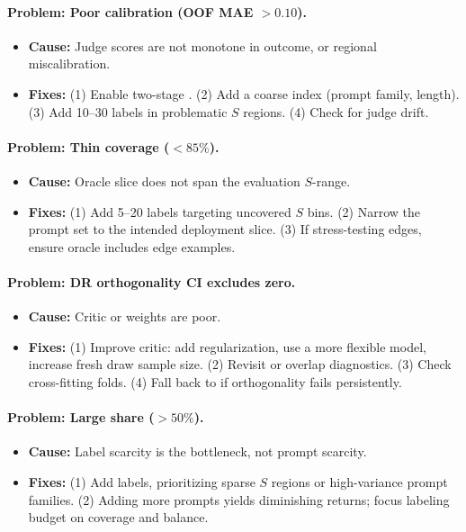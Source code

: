 \paragraph{Problem: Poor calibration (OOF MAE $> 0.10$).}
\begin{itemize}
\item \textbf{Cause:} Judge scores are not monotone in outcome, or regional miscalibration.
\item \textbf{Fixes:} (1) Enable two-stage \autocal. (2) Add a coarse index (prompt family, length). (3) Add 10--30 labels in problematic $S$ regions. (4) Check for judge drift.
\end{itemize}

\paragraph{Problem: Thin coverage ($< 85\%$).}
\begin{itemize}
\item \textbf{Cause:} Oracle slice does not span the evaluation $S$-range.
\item \textbf{Fixes:} (1) Add 5--20 labels targeting uncovered $S$ bins. (2) Narrow the prompt set to the intended deployment slice. (3) If stress-testing edges, ensure oracle includes edge examples.
\end{itemize}

\paragraph{Problem: DR orthogonality CI excludes zero.}
\begin{itemize}
\item \textbf{Cause:} Critic or weights are poor.
\item \textbf{Fixes:} (1) Improve critic: add regularization, use a more flexible model, increase fresh draw sample size. (2) Revisit \simcal{} or overlap diagnostics. (3) Check cross-fitting folds. (4) Fall back to \ips{} if orthogonality fails persistently.
\end{itemize}

\paragraph{Problem: Large \oua{} share ($> 50\%$).}
\begin{itemize}
\item \textbf{Cause:} Label scarcity is the bottleneck, not prompt scarcity.
\item \textbf{Fixes:} (1) Add labels, prioritizing sparse $S$ regions or high-variance prompt families. (2) Adding more prompts yields diminishing returns; focus labeling budget on coverage and balance.
\end{itemize}

